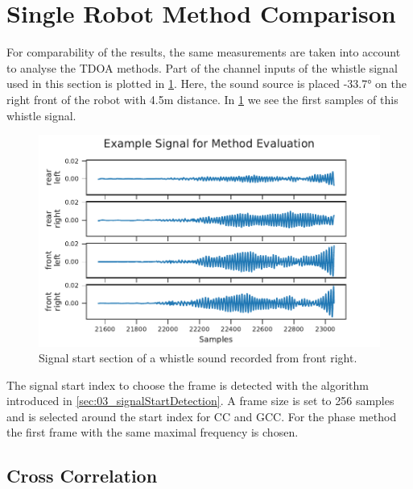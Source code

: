 \section{Single Robot Method Comparison}
\label{sec:04_tdoaSingle}

For comparability of the results, the same measurements are taken into
account to analyse the \ac{TDOA} methods.
Part of the channel inputs of the whistle signal used in this section is plotted
in \ref{fig:04_tdoaSignal}.
Here, the sound source is placed -33.7\si{\degree} on the right front
of the robot with 4.5\si{m} distance.
In \cref{fig:04_tdoaSignal} we see the first samples of this whistle signal.
\begin{figure}[ht]
	\centering
		\includegraphics[]{figures/evaluation/cc_frontRight_1_signal}
	\caption{Signal start section of a whistle sound recorded from front right.}
	\label{fig:04_tdoaSignal}
\end{figure}

The signal start index to choose the frame is detected with the algorithm introduced in
 \cref{sec:03_signalStartDetection}.
A frame size is set to 256 samples and is selected around the start index for
\ac{CC} and \ac{GCC}.
For the phase method the first frame with the same maximal frequency is chosen.

\subsection{Cross Correlation}
\label{subsec:04_ccSingle}


